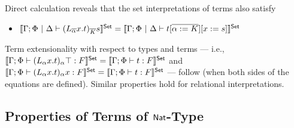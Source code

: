 \documentclass[runningheads]{llncs}
\begin{document}
Direct calculation reveals that the set interpretations of terms also
satisfy
\begin{itemize}
\item $\llbracket{\Gamma; \Phi~|~\Delta \vdash
  (L_{\overline{\alpha}}x.t)_{\overline{K}}s}\rrbracket^{\mathsf{Set}} = \llbracket{\Gamma; \Phi~|~\Delta
  \vdash t [\overline{\alpha := K}][x := s]}\rrbracket^{\mathsf{Set}}$
\end{itemize}
Term extensionality with respect to types and terms --- i.e.,
$\llbracket{\Gamma;\Phi\vdash (L_\alpha x.t)_\alpha \top : F}\rrbracket^{\mathsf{Set}} =
\llbracket{\Gamma;\Phi \vdash t : F}\rrbracket^{\mathsf{Set}}$ and $\llbracket{\Gamma;\Phi\vdash
  (L_\alpha x.t)_\alpha x : F}\rrbracket^{\mathsf{Set}} = \llbracket{\Gamma;\Phi \vdash t : F}\rrbracket^{\mathsf{Set}}$
--- follow (when both sides of the equations are defined). Similar
properties hold for relational interpretations.

\subsection{Properties of Terms of $\mathsf{Nat}$-Type}\label{sec:Nat-type-terms}
\end{document}
